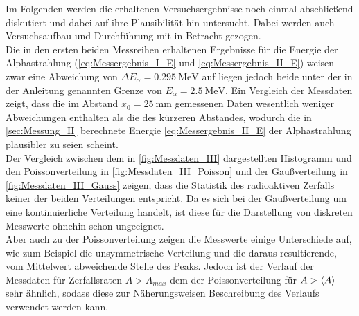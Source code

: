 Im Folgenden werden die erhaltenen Versuchsergebnisse noch einmal
abschließend diskutiert und dabei auf ihre Plausibilität hin untersucht.
Dabei werden auch Versuchsaufbau und Durchführung mit in Betracht gezogen.\\

Die in den ersten beiden Messreihen erhaltenen Ergebnisse für die 
Energie der Alphastrahlung (\cref{eq:Messergebnis_I_E} und \cref{eq:Messergebnis_II_E})
weisen zwar eine Abweichung von $\Delta E_{\alpha} = \SI{0.295}{\mega\eV}$ auf liegen
jedoch beide unter der in der Anleitung \cite{V701} genannten Grenze von 
$E_{\alpha} = \SI{2.5}{\mega\eV}$.
Ein Vergleich der Messdaten zeigt, dass die im Abstand $x_{0} = \SI{25}{\milli\meter}$ 
gemessenen Daten wesentlich weniger Abweichungen enthalten als die des kürzeren Abstandes,
wodurch die in \cref{sec:Messung_II}  berechnete Energie \cref{eq:Messergebnis_II_E} 
der Alphastrahlung plausibler zu seien scheint. \\

Der Vergleich zwischen dem in \cref{fig:Messdaten_III} dargestellten Histogramm und 
den Poissonverteilung in \cref{fig:Messdaten_III_Poisson} und der Gaußverteilung in
\cref{fig:Messdaten_III_Gauss} zeigen, dass die Statistik des radioaktiven Zerfalls
keiner der beiden Verteilungen entspricht. Da es sich bei der Gaußverteilung um eine 
kontinuierliche Verteilung handelt, ist diese für die Darstellung von diskreten Messwerte
ohnehin schon ungeeignet.\\
Aber auch zu der Poissonverteilung zeigen die Messwerte einige Unterschiede auf,
wie zum Beispiel die unsymmetrische Verteilung und die daraus resultierende,
vom Mittelwert abweichende Stelle des Peaks. Jedoch ist der Verlauf der Messdaten für
Zerfallsraten $A > A_{max}$ dem der Poissonverteilung  für $A > \langle A\rangle$ sehr ähnlich, 
sodass diese zur Näherungsweisen Beschreibung des Verlaufs verwendet werden kann. 